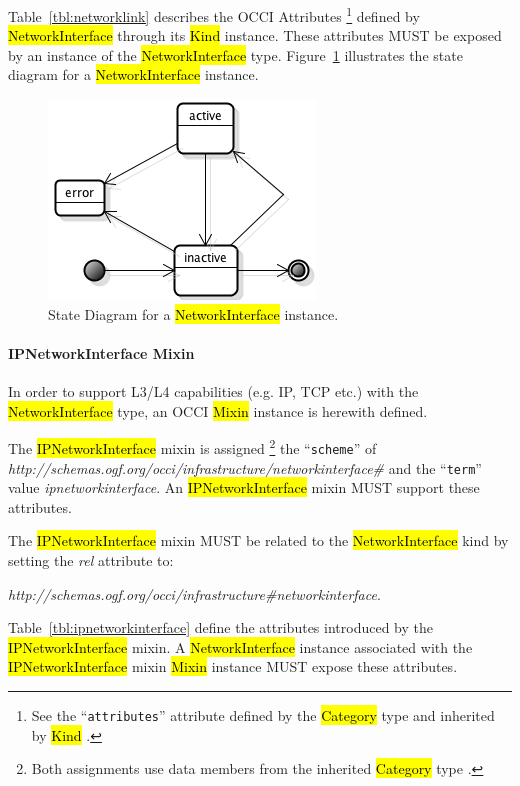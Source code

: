 \documentclass[10pt,a4paper]{article}
\begin{document}
Table~\ref{tbl:networklink} describes the OCCI Attributes%
\footnote{See the ``{\tt attributes}'' attribute defined by the
  \hl{Category} type and inherited by \hl{Kind} \cite{occi:core}.}
defined by \hl{NetworkInterface} through its \hl{Kind} instance. These
attributes MUST be exposed by an instance of the \hl{NetworkInterface}
type.  Figure~\ref{fig:networklink_state} illustrates the state
diagram for a \hl{NetworkInterface} instance.

\begin{figure}[!h]
	\centering
	\includegraphics[scale=0.4]{figs/infra-link-state.png}
	\caption{State Diagram for a \hl{NetworkInterface} instance.}
	\label{fig:networklink_state}
\end{figure}

\paragraph{IPNetworkInterface Mixin}
In order to support L3/L4 capabilities (e.g. IP, TCP etc.) with the
\hl{NetworkInterface} type, an OCCI \hl{Mixin} instance is herewith
defined.

The \hl{IPNetworkInterface} mixin is assigned%
\footnote{Both assignments use data members from the inherited \hl{Category}
type \cite{occi:core}.}
the ``{\tt scheme}'' of
\textit{http://schemas.ogf.org/occi/infrastructure/networkinterface\#} and the ``{\tt term}'' value 
\textit{ipnetworkinterface}. 
An \hl{IPNetworkInterface} mixin MUST support these attributes.

The \hl{IPNetworkInterface} mixin MUST be related to the \hl{NetworkInterface} kind 
by setting the \textit{rel} attribute to:

\textit{http://schemas.ogf.org/occi/infrastructure\#networkinterface}.

Table~\ref{tbl:ipnetworkinterface} define the attributes introduced by
the \hl{IPNetworkInterface} mixin.  A \hl{NetworkInterface} instance
associated with the \hl{IPNetworkInterface} mixin \hl{Mixin} instance
MUST expose these attributes.
\end{document}
